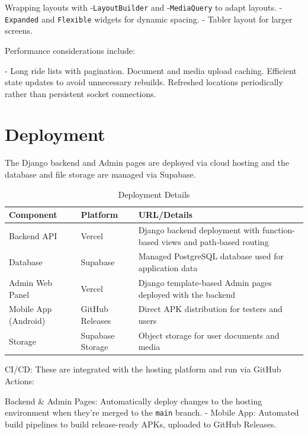 Wrapping layouts with -\texttt{LayoutBuilder} and -\texttt{MediaQuery} to adapt layouts.
- \texttt{Expanded} and \texttt{Flexible} widgets for dynamic spacing.
- Tabler layout for larger screens.

Performance considerations include:

- Long ride lists with pagination.
Document and media upload caching.
Efficient state updates to avoid unnecessary rebuilds.
Refreshed locations periodically rather than persistent socket connections.


\section{Deployment}

The Django backend and Admin pages are deployed via cloud hosting and the database and file storage are managed via Supabase.

\begin{table}[htbp]
\centering
\caption{Deployment Details}
\begin{tabularx}{\textwidth}{|p{3cm}|p{3cm}|X|}
\hline
\textbf{Component} & \textbf{Platform} & \textbf{URL/Details} \\
\hline
Backend API & Vercel & Django backend deployment with function-based views and path-based routing \\
\hline
Database & Supabase & Managed PostgreSQL database used for application data \\
\hline
Admin Web Panel & Vercel & Django template-based Admin pages deployed with the backend \\
\hline
Mobile App (Android) & GitHub Releases & Direct APK distribution for testers and users \\
\hline
Storage & Supabase Storage & Object storage for user documents and media \\
\hline
\end{tabularx}
\end{table}

CI/CD: These are integrated with the hosting platform and run via GitHub Actions:

Backend \& Admin Pages: Automatically deploy changes to the hosting environment when they're merged to the \texttt{main} branch.
- Mobile App: Automated build pipelines to build release-ready APKs, uploaded to GitHub Releases.


